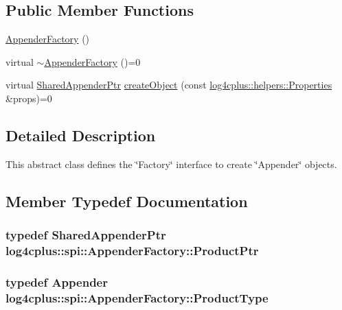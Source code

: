 \subsection*{Public Member Functions}
\begin{DoxyCompactItemize}
\item 
\hyperlink{classlog4cplus_1_1spi_1_1AppenderFactory_a9307151d73ddecf11b6d3938f4c98822}{Appender\-Factory} ()
\item 
virtual \hyperlink{classlog4cplus_1_1spi_1_1AppenderFactory_a8ff46e24f9c0375777c858e5445697b2}{$\sim$\-Appender\-Factory} ()=0
\item 
virtual \hyperlink{namespacelog4cplus_a12d841b842c72396be9219ce67a0c215}{Shared\-Appender\-Ptr} \hyperlink{classlog4cplus_1_1spi_1_1AppenderFactory_a9a55e66d4b39e8aacad3be37f4b184f1}{create\-Object} (const \hyperlink{classlog4cplus_1_1helpers_1_1Properties}{log4cplus\-::helpers\-::\-Properties} \&props)=0
\end{DoxyCompactItemize}


\subsection{Detailed Description}
This abstract class defines the \char`\"{}\-Factory\char`\"{} interface to create \char`\"{}\-Appender\char`\"{} objects. 

\subsection{Member Typedef Documentation}
\hypertarget{classlog4cplus_1_1spi_1_1AppenderFactory_a05a326890cbe23183a34c07df4f81ff2}{
\subsubsection[{Product\-Ptr}]{\setlength{\rightskip}{0pt plus 5cm}typedef {\bf Shared\-Appender\-Ptr} {\bf log4cplus\-::spi\-::\-Appender\-Factory\-::\-Product\-Ptr}}}\label{classlog4cplus_1_1spi_1_1AppenderFactory_a05a326890cbe23183a34c07df4f81ff2}
\hypertarget{classlog4cplus_1_1spi_1_1AppenderFactory_af20a9aa3cc06268597c1e91bc63020fd}{
\subsubsection[{Product\-Type}]{\setlength{\rightskip}{0pt plus 5cm}typedef {\bf Appender} {\bf log4cplus\-::spi\-::\-Appender\-Factory\-::\-Product\-Type}}}\label{classlog4cplus_1_1spi_1_1AppenderFactory_af20a9aa3cc06268597c1e91bc63020fd}


